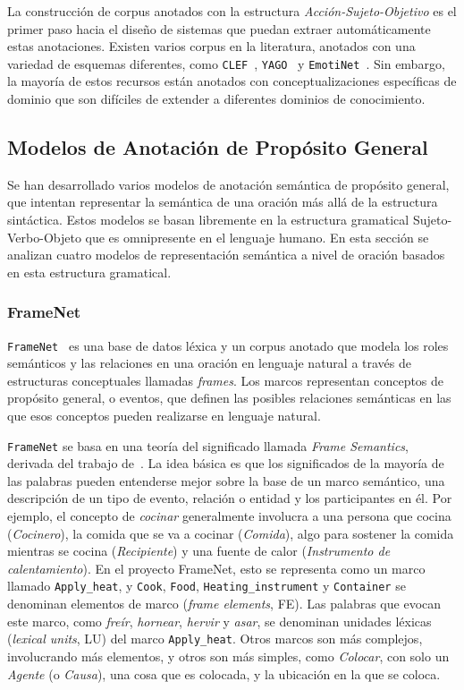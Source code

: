 La construcción de corpus anotados con la estructura \textit{Acción-Sujeto-Objetivo} es el primer paso hacia el diseño de sistemas que puedan extraer automáticamente estas anotaciones.
Existen varios corpus en la literatura, anotados con una variedad de esquemas diferentes, como \texttt{CLEF}~\cite{kelly2016overview}, \texttt{YAGO}~\cite{suchanek2007yago} y \texttt{EmotiNet}~\cite{Balahur2011}.
Sin embargo, la mayoría de estos recursos están anotados con conceptualizaciones específicas de dominio que son difíciles de extender a diferentes dominios de conocimiento.

\subsection{Modelos de Anotación de Propósito General}\label{sec:general}

Se han desarrollado varios modelos de anotación semántica de propósito general, que intentan representar la semántica de una oración más allá de la estructura sintáctica.
Estos modelos se basan libremente en la estructura gramatical Sujeto-Verbo-Objeto que es omnipresente en el lenguaje humano.
En esta sección se analizan cuatro modelos de representación semántica a nivel de oración basados en esta estructura gramatical.

\subsubsection*{FrameNet}

\texttt{FrameNet}~\cite{framenet} es una base de datos léxica y un corpus anotado que modela los roles semánticos y las relaciones en una oración en lenguaje natural a través de estructuras conceptuales llamadas \textit{frames}.
Los marcos representan conceptos de propósito general, o eventos, que definen las posibles relaciones semánticas en las que esos conceptos pueden realizarse en lenguaje natural.

\texttt{FrameNet} se basa en una teoría del significado llamada \textit{Frame Semantics}, derivada del trabajo de~\citet{fillmore2003background}.
La idea básica es que los significados de la mayoría de las palabras pueden entenderse mejor sobre la base de un marco semántico, una descripción de un tipo de evento, relación o entidad y los participantes en él.
Por ejemplo, el concepto de \textit{cocinar} generalmente involucra a una persona que cocina (\textit{Cocinero}), la comida que se va a cocinar (\textit{Comida}), algo para sostener la comida mientras se cocina (\textit{Recipiente}) y una fuente de calor (\textit{Instrumento de calentamiento}).
En el proyecto FrameNet, esto se representa como un marco llamado \texttt{Apply\_heat}, y \texttt{Cook}, \texttt{Food}, \texttt{Heating\_instrument} y \texttt{Container} se denominan elementos de marco (\textit{frame elements}, FE). Las palabras que evocan este marco, como \textit{freír}, \textit{hornear}, \textit{hervir} y \textit{asar}, se denominan unidades léxicas (\textit{lexical units}, LU) del marco \texttt{Apply\_heat}.
Otros marcos son más complejos, involucrando más elementos, y otros son más simples, como \textit{Colocar}, con solo un \textit{Agente} (o \textit{Causa}), una cosa que es colocada, y la ubicación en la que se coloca.

